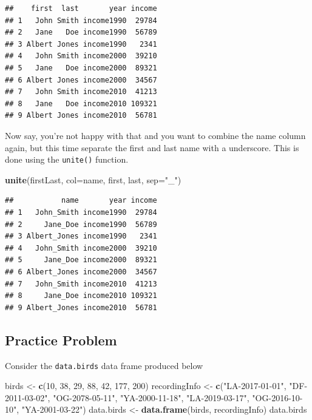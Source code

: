 \documentclass[
]{krantz}
\newenvironment{Shaded}{\begin{snugshade}}{\end{snugshade}}
\newcommand{\DataTypeTok}[1]{\textcolor[rgb]{0.13,0.29,0.53}{#1}}
\newcommand{\DecValTok}[1]{\textcolor[rgb]{0.00,0.00,0.81}{#1}}
\newcommand{\KeywordTok}[1]{\textcolor[rgb]{0.13,0.29,0.53}{\textbf{#1}}}
\newcommand{\NormalTok}[1]{#1}
\newcommand{\StringTok}[1]{\textcolor[rgb]{0.31,0.60,0.02}{#1}}
\begin{document}
\begin{verbatim}
##    first  last       year income
## 1   John Smith income1990  29784
## 2   Jane   Doe income1990  56789
## 3 Albert Jones income1990   2341
## 4   John Smith income2000  39210
## 5   Jane   Doe income2000  89321
## 6 Albert Jones income2000  34567
## 7   John Smith income2010  41213
## 8   Jane   Doe income2010 109321
## 9 Albert Jones income2010  56781
\end{verbatim}

Now say, you're not happy with that and you want to combine the name column again, but this time separate the first and last name with a underscore. This is done using the \texttt{unite()} function.

\begin{Shaded}
\begin{Highlighting}[]
\KeywordTok{unite}\NormalTok{(firstLast, }\DataTypeTok{col=}\NormalTok{name, first, last, }\DataTypeTok{sep=}\StringTok{"\_"}\NormalTok{)}
\end{Highlighting}
\end{Shaded}

\begin{verbatim}
##           name       year income
## 1   John_Smith income1990  29784
## 2     Jane_Doe income1990  56789
## 3 Albert_Jones income1990   2341
## 4   John_Smith income2000  39210
## 5     Jane_Doe income2000  89321
## 6 Albert_Jones income2000  34567
## 7   John_Smith income2010  41213
## 8     Jane_Doe income2010 109321
## 9 Albert_Jones income2010  56781
\end{verbatim}

\hypertarget{Ch6PP3}{%
\subsection{Practice Problem}\label{Ch6PP3}}

Consider the \texttt{data.birds} data frame produced below

\begin{Shaded}
\begin{Highlighting}[]
\NormalTok{birds \textless{}{-}}\StringTok{ }\KeywordTok{c}\NormalTok{(}\DecValTok{10}\NormalTok{, }\DecValTok{38}\NormalTok{, }\DecValTok{29}\NormalTok{, }\DecValTok{88}\NormalTok{, }\DecValTok{42}\NormalTok{, }\DecValTok{177}\NormalTok{, }\DecValTok{200}\NormalTok{)}
\NormalTok{recordingInfo \textless{}{-}}\StringTok{ }\KeywordTok{c}\NormalTok{(}\StringTok{"LA{-}2017{-}01{-}01"}\NormalTok{, }\StringTok{"DF{-}2011{-}03{-}02"}\NormalTok{, }\StringTok{"OG{-}2078{-}05{-}11"}\NormalTok{, }\StringTok{"YA{-}2000{-}11{-}18"}\NormalTok{, }
                   \StringTok{"LA{-}2019{-}03{-}17"}\NormalTok{, }\StringTok{"OG{-}2016{-}10{-}10"}\NormalTok{, }\StringTok{"YA{-}2001{-}03{-}22"}\NormalTok{)}
\NormalTok{data.birds \textless{}{-}}\StringTok{ }\KeywordTok{data.frame}\NormalTok{(birds, recordingInfo)}
\NormalTok{data.birds}
\end{Highlighting}
\end{Shaded}
\end{document}
